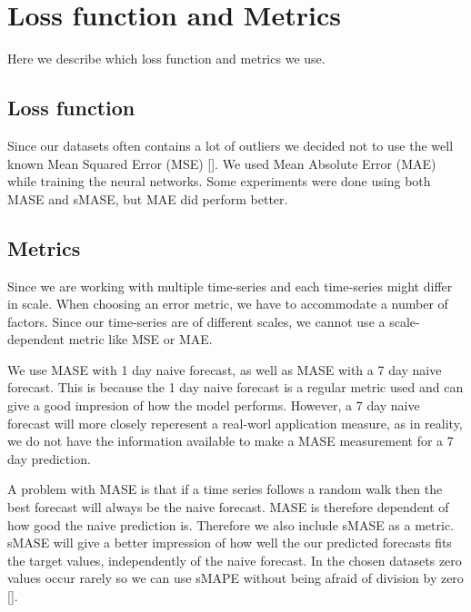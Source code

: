 
\section{Loss function and Metrics}
\label{section:Method:Metrics}

Here we describe which loss function and metrics we use.

\subsection*{Loss function}
Since our datasets often contains a lot of outliers we decided not to use the well known
Mean Squared Error (MSE) [].
We used Mean Absolute Error (MAE) while training the neural networks.
Some experiments were done using both MASE and sMASE, but MAE did perform better.

\subsection*{Metrics}
Since we are working with multiple time-series and each time-series might differ in scale.
When choosing an error metric, we have to accommodate a number of factors.
Since our time-series are of different scales, we cannot use a scale-dependent metric
like MSE or MAE.


We use MASE with 1 day naive forecast, as well as MASE with a 7 day
naive forecast. This is because the 1 day naive forecast is a regular metric used
and can give a good impresion of how the model performs.
However, a 7 day naive forecast will more closely reperesent a real-worl application measure,
as in reality, we do not have the information available to make a MASE measurement for a 7 day prediction.

A problem with MASE is that if a time series follows a random walk
then the best forecast will always be the naive forecast. MASE is therefore dependent of
how good the naive prediction is.
Therefore we also include sMASE as a metric.
sMASE will give a better impression of how well the our predicted forecasts fits the target values,
independently of the naive forecast.
In the chosen datasets zero values occur rarely so we can use sMAPE without
being afraid of division by zero [].

